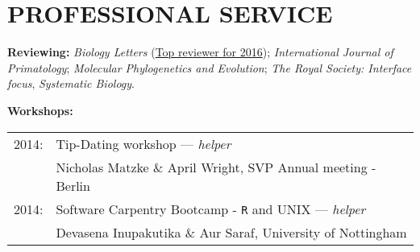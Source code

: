 \documentclass[10pt,a4paper]{article}
\begin{document}
{%


\bigskip


\section{PROFESSIONAL SERVICE}
\raggedright\textbf{Reviewing:}
\textit{Biology Letters} (\href{http://blogs.royalsociety.org/publishing/biology-letters-top-reviewers-from-2016/}{Top reviewer for 2016}); \textit{International Journal of Primatology}; \textit{Molecular Phylogenetics and Evolution}; \textit{The Royal Society: Interface focus}, \textit{Systematic Biology}.

\bigskip
\raggedright\textbf{Workshops:}

\begin{tabular}{ll}
2014: & Tip-Dating workshop --- \textit{helper}\\
& Nicholas Matzke \& April Wright, SVP Annual meeting - Berlin\\
2014: & Software Carpentry Bootcamp - \texttt{R} and UNIX --- \textit{helper}\\
& Devasena Inupakutika \& Aur Saraf, University of Nottingham\\
\end{tabular}

}
\end{document}
